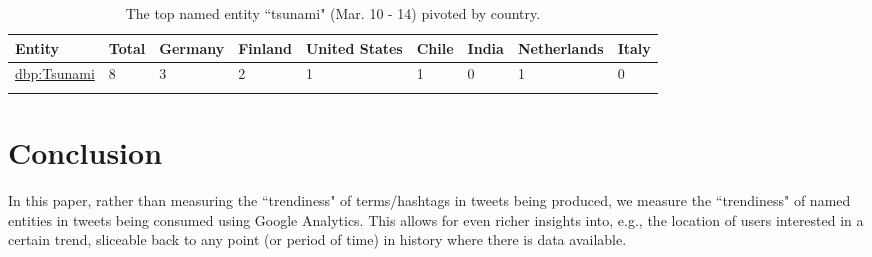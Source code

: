 \documentclass[runningheads,a4paper]{llncs}
\begin{document}
\begin{table}[htb!]
\begin{center}
\begin{tabular}{lllllllll}
\hline
Entity & Total & Germany & Finland & United States & Chile & India & Netherlands & Italy \\
\hline
\url{dbp:Tsunami} & 8 & 3 & 2 & 1 & 1 & 0 & 1 & 0 \\
\hline \\
\end{tabular}
\end{center}
\caption{The top named entity ``tsunami" (Mar. 10 - 14) pivoted by country.}
\end{table}

\section{Conclusion}\label{sec:conclusion}
In this paper, rather than measuring the ``trendiness" of terms/hashtags in tweets being produced, we measure the ``trendiness" of named entities in tweets being consumed using Google Analytics. This allows for even richer insights into, e.g., the location of users interested in a certain trend, sliceable back to any point (or period of time) in history where there is data available.




\end{document}

